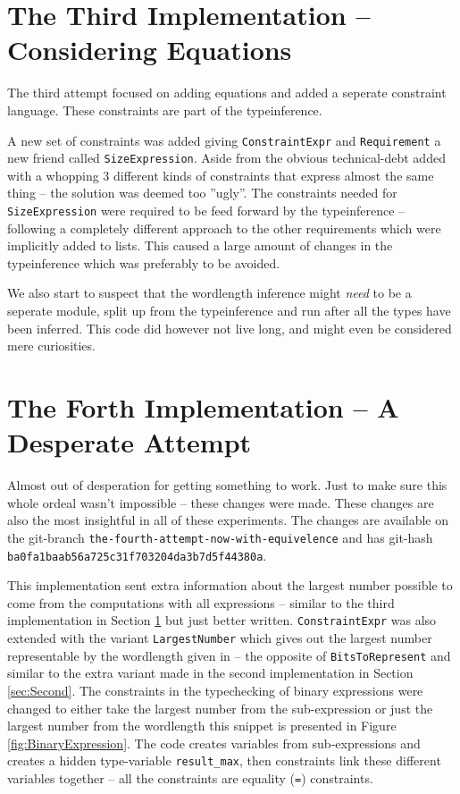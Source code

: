 \documentclass[msc,lith,english]{liuthesis}
\begin{document}
\section{The Third Implementation -- Considering Equations}
\label{sec:Third}
The third attempt focused on adding equations and added a seperate constraint language. These constraints are part of the typeinference.

A new set of constraints was added giving \verb+ConstraintExpr+ and \verb+Requirement+ a new friend called \verb+SizeExpression+. Aside from the obvious technical-debt added with a whopping 3 different kinds of constraints that express almost the same thing -- the solution was deemed too ''ugly''. The constraints needed for \verb+SizeExpression+ were required to be feed forward by the typeinference -- following a completely different approach to the other requirements which were implicitly added to lists. This caused a large amount of changes in the typeinference which was preferably to be avoided.

We also start to suspect that the wordlength inference might \textit{need} to be a seperate module, split up from the typeinference and run after all the types have been inferred. This code did however not live long, and might even be considered mere curiosities.

\section{The Forth Implementation -- A Desperate Attempt}
Almost out of desperation for getting something to work. Just to make sure this whole ordeal wasn't impossible -- these changes were made. These changes are also the most insightful in all of these experiments. The changes are available on the git-branch \verb+the-fourth-attempt-now-with-equivelence+ and has git-hash \verb+ba0fa1baab56a725c31f703204da3b7d5f44380a+.

This implementation sent extra information about the largest number possible to come from the computations with all expressions -- similar to the third implementation in Section \ref{sec:Third} but just better written. \verb+ConstraintExpr+ was also extended with the variant \verb+LargestNumber+ which gives out the largest number representable by the wordlength given in -- the opposite of \verb+BitsToRepresent+ and similar to the extra variant made in the second implementation in Section \ref{sec:Second}. The constraints in the typechecking of binary expressions were changed to either take the largest number from the sub-expression or just the largest number from the wordlength this snippet is presented in Figure \ref{fig:BinaryExpression}. The code creates variables from sub-expressions and creates a hidden type-variable \verb+result_max+, then constraints link these different variables together -- all the constraints are equality (\verb+=+) constraints.
\end{document}

